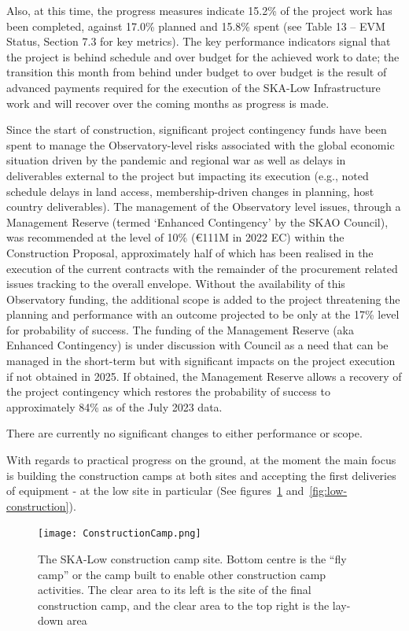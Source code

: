 \documentclass[a4paper,
               biblatex,     %
               keeplastbox,   %
               ]{jacow}
\begin{document}
Also, at this time, the progress measures indicate 15.2\% of the project work has been completed, against 17.0\% planned and 15.8\% spent (see Table 13 – EVM Status, Section 7.3 for key metrics).  The key performance indicators signal that the project is behind schedule and over budget for the achieved work to date; the transition this month from behind under budget to over budget is the result of advanced payments required for the execution of the SKA-Low Infrastructure work and will recover over the coming months as progress is made.

Since the start of construction, significant project contingency funds have been spent to manage the Observatory-level risks associated with the global economic situation driven by the pandemic and regional war as well as delays in deliverables external to the project but impacting its execution (e.g., noted schedule delays in land access, membership-driven changes in planning, host country deliverables). The management of the Observatory level issues, through a Management Reserve (termed ‘Enhanced Contingency’ by the SKAO Council), was recommended at the level of 10\% (€111M in 2022 EC) within the Construction Proposal, approximately half of which has been realised in the execution of the current contracts with the remainder of the procurement related issues tracking to the overall envelope. Without the availability of this Observatory funding, the additional scope is added to the project threatening the planning and performance with an outcome projected to be only at the 17\% level for probability of success. The funding of the Management Reserve (aka Enhanced Contingency) is under discussion with Council as a need that can be managed in the short-term but with significant impacts on the project execution if not obtained in 2025. If obtained, the Management Reserve allows a recovery of the project contingency which restores the probability of success to approximately 84\% as of the July 2023 data.

There are currently no significant changes to either performance or scope.

With regards to practical progress on the ground, at the moment the main focus is building the construction camps at both sites and accepting the first deliveries of equipment - at the low site in particular (See figures~\ref{fig:low-camp} and~\ref{fig:low-construction}).

\begin{figure}[tb]
	\centering
  \texttt{[image: ConstructionCamp.png]}    
	\caption{The SKA-Low construction camp site. Bottom centre is the ``fly camp'' or the camp built to enable other construction camp activities. The clear area to its left is the site of the final construction camp, and the clear area to the top right is the lay-down area}
	\label{fig:low-camp}
  \end{figure}
\end{document}
